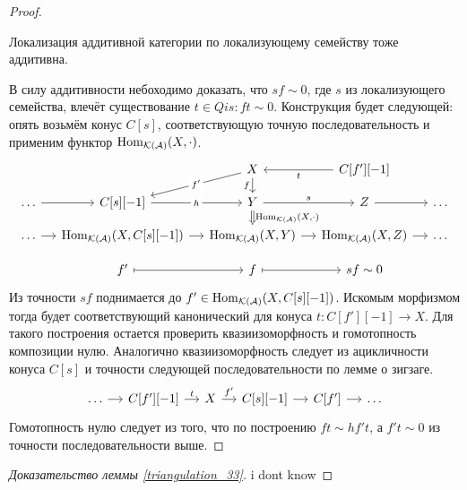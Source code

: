 \documentclass[../main.tex]{subfiles}
\begin{document}
\begin{proof}
\begin{to_lem}
Локализация аддитивной категории по локализующему семейству тоже аддитивна.
\end{to_lem}
В силу аддитивности небоходимо доказать, что $sf\sim 0$, где $s$ из локализующего семейства, влечёт существование $t\in Qis: ft\sim 0$.
Конструкция будет следующей: опять возьмём конус $C[s]$, соответствующую точную последовательность и применим функтор $\operatorname{Hom}_{\mathcal{K}(\mathcal{A})}(X, \cdot)$.
    \begin{equation*}
        \begin{tikzcd}[sep=small]
	&& X&C[f'][-1] \\
	\ldots & {C[s][-1]} & Y & Z & \ldots \\
	\ldots & {\Hom_{\mathcal{K}(\mathcal{A})}(X, C[s][-1])} & {\Hom_{\mathcal{K}(\mathcal{A})}(X, Y)} & {\Hom_{\mathcal{K}(\mathcal{A})}(X, Z)} & \ldots \\
	& {f'} & f & {sf\sim 0}
    \arrow[from=1-4, to=1-3, "t"]
	\arrow["h"{description}, from=2-2, to=2-3]
	\arrow["s", from=2-3, to=2-4]
	\arrow[from=2-4, to=2-5]
	\arrow[from=2-1, to=2-2]
	\arrow["{\Hom_{\mathcal{K}(\mathcal{A})}(X, \cdot)}", Rightarrow, from=2-3, to=3-3]
	\arrow[from=3-2, to=3-3]
	\arrow[from=3-1, to=3-2]
	\arrow[from=3-3, to=3-4]
	\arrow[from=3-4, to=3-5]
	\arrow["f"', from=1-3, to=2-3]
	\arrow[maps to, from=4-3, to=4-4]
	\arrow[maps to, from=4-2, to=4-3]
    \arrow[from=1-3, to=2-2, "f'"{description}]
\end{tikzcd}
    \end{equation*}
Из точности $sf$ поднимается до $f'\in \operatorname{Hom}_{\mathcal{K}(\mathcal{A})}(X, C[s][-1])$. Искомым морфизмом тогда будет соответствующий канонический для конуса $t:C[f'][-1]\to X$.
Для такого построения остается проверить квазиизоморфность и гомотопность композиции нулю. Аналогично квазиизоморфность следует из ацикличности конуса $C[s]$ и точности следующей последовательности по лемме о зигзаге.
\begin{equation*}
    \begin{tikzcd}[sep=small]
	\ldots & {C[f'][-1]} & X & {C[s][-1]} & {C[f']} & \ldots
	\arrow["t", from=1-2, to=1-3]
	\arrow["f'", from=1-3, to=1-4]
	\arrow[from=1-4, to=1-5]
	\arrow[from=1-5, to=1-6]
	\arrow[from=1-1, to=1-2]
\end{tikzcd}
\end{equation*}
Гомотопность нулю следует из того, что по построению $ft\sim hf't$, а $f't\sim 0$ из точности последовательности выше.
\end{proof}
\begin{proof}[Доказательство леммы \ref{triangulation_33}]
    i dont know
\end{proof}
\end{document}
